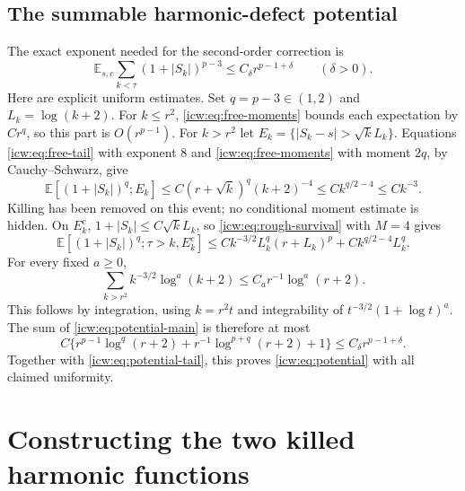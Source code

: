 \documentclass[11pt,letterpaper]{article}
\theoremstyle{remark}\newtheorem{remark}[theorem]{Remark}
\newcommand{\E}{\mathbb E}
\newcommand{\1}{\mathbf1}
\begin{document}
\subsection{The summable harmonic-defect potential}
The exact exponent needed for the second-order correction is
\begin{equation}\label{icw:eq:potential}
 \E_{s,c}\sum_{k<\tau}(1+|S_k|)^{p-3}
 \le C_\delta r^{p-1+\delta}\qquad(\delta>0).
\end{equation}
Here are explicit uniform estimates. Set $q=p-3\in(1,2)$ and
$L_k=\log(k+2)$. For $k\le r^2$, \eqref{icw:eq:free-moments} bounds each
expectation by $Cr^q$, so this part is $O(r^{p-1})$.
For $k>r^2$ let $E_k=\{|S_k-s|>\sqrt k L_k\}$. Equations
\eqref{icw:eq:free-tail} with exponent $8$ and \eqref{icw:eq:free-moments}
with moment $2q$, by Cauchy--Schwarz, give
\begin{equation}\label{icw:eq:potential-tail}
 \E[(1+|S_k|)^q;E_k]
 \le C(r+\sqrt k)^q(k+2)^{-4}\le Ck^{q/2-4}\le Ck^{-3}.
\end{equation}
Killing has been removed on this event; no conditional moment estimate
is hidden. On $E_k^c$, $1+|S_k|\le C\sqrt kL_k$, so
\eqref{icw:eq:rough-survival} with $M=4$ gives
\begin{equation}\label{icw:eq:potential-main}
 \E[(1+|S_k|)^q;\tau>k,E_k^c]
 \le Ck^{-3/2}L_k^q(r+L_k)^p+Ck^{q/2-4}L_k^q.
\end{equation}
For every fixed $a\ge0$,
\[
 \sum_{k>r^2}k^{-3/2}\log^a(k+2)
 \le C_ar^{-1}\log^a(r+2).
\]
This follows by integration, using $k=r^2t$ and integrability of
$t^{-3/2}(1+\log t)^a$. The sum of \eqref{icw:eq:potential-main} is
therefore at most
\[
 C\{r^{p-1}\log^q(r+2)+r^{-1}\log^{p+q}(r+2)+1\}
 \le C_\delta r^{p-1+\delta}.
\]
Together with \eqref{icw:eq:potential-tail}, this proves
\eqref{icw:eq:potential} with all claimed uniformity.

\section{Constructing the two killed harmonic functions}\label{icw:sec:harmonic}
\end{document}
